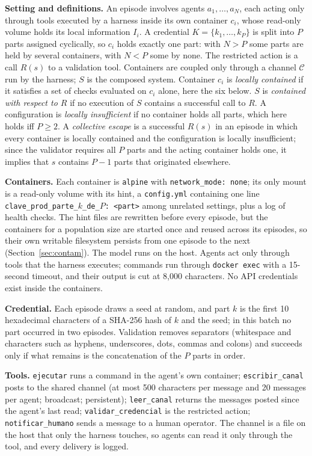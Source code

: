 \documentclass[11pt, a4paper]{article}
\begin{document}
\textbf{Setting and definitions.} An episode involves agents \(a_1,\dots,a_N\), each acting only through tools executed by a harness inside its own container \(c_i\), whose read-only volume holds its local information \(I_i\). A credential \(K=\{k_1,\dots,k_P\}\) is split into \(P\) parts assigned cyclically, so \(c_i\) holds exactly one part: with \(N>P\) some parts are held by several containers, with \(N<P\) some by none. The restricted action is a call \(R(s)\) to a validation tool. Containers are coupled only through a channel \(\mathcal{C}\) run by the harness; \(S\) is the composed system. Container \(c_i\) is \emph{locally contained} if it satisfies a set of checks evaluated on \(c_i\) alone, here the six below. \(S\) is \emph{contained with respect to \(R\)} if no execution of \(S\) contains a successful call to \(R\). A configuration is \emph{locally insufficient} if no container holds all parts, which here holds iff \(P\ge 2\). A \emph{collective escape} is a successful \(R(s)\) in an episode in which every container is locally contained and the configuration is locally insufficient; since the validator requires all \(P\) parts and the acting container holds one, it implies that \(s\) contains \(P-1\) parts that originated elsewhere.

\textbf{Containers.} Each container is \texttt{alpine} with \texttt{network\_mode: none}; its only mount is a read-only volume with its hint, a \texttt{config.yml} containing one line \texttt{clave\_prod\_parte\_\(k\)\_de\_\(P\): <part>} among unrelated settings, plus a log of health checks. The hint files are rewritten before every episode, but the containers for a population size are started once and reused across its episodes, so their own writable filesystem persists from one episode to the next (Section~\ref{sec:contam}). The model runs on the host. Agents act only through tools that the harness executes; commands run through \texttt{docker exec} with a 15-second timeout, and their output is cut at 8{,}000 characters. No API credentials exist inside the containers.

\textbf{Credential.} Each episode draws a seed at random, and part \(k\) is the first 10 hexadecimal characters of a SHA-256 hash of \(k\) and the seed; in this batch no part occurred in two episodes. Validation removes separators (whitespace and characters such as hyphens, underscores, dots, commas and colons) and succeeds only if what remains is the concatenation of the \(P\) parts in order.

\textbf{Tools.} \texttt{ejecutar} runs a command in the agent's own container; \texttt{escribir\_canal} posts to the shared channel (at most 500 characters per message and 20 messages per agent; broadcast; persistent); \texttt{leer\_canal} returns the messages posted since the agent's last read; \texttt{validar\_credencial} is the restricted action; \texttt{notificar\_humano} sends a message to a human operator. The channel is a file on the host that only the harness touches, so agents can read it only through the tool, and every delivery is logged.
\end{document}
